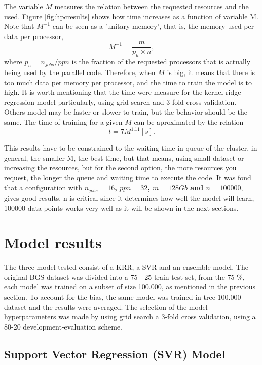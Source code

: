 The variable $M$ measures the relation between the requested resources and the used. Figure \ref{fig:hpcresults} shows how time increases as a function of variable M. Note that $M^{-1}$ can be seen as a 'unitary memory', that is, the memory used per data per processor,
\begin{equation*}
M^{-1} = \frac{m}{p_u \times n},
\end{equation*}
where $p_u = n_{jobs}/ppn$ is the fraction of the requested processors that is actually being used by the parallel code. Therefore, when $M$ is big, it means that there is too much data per memory per processor, and the time to train the model is to high. It is worth mentioning that the time were measure for the kernel ridge regression model particularly, using grid search and 3-fold cross validation. Others model may be faster or slower to train, but the behavior should be the same. The time of training for a given $M$ can be aproximated by the relation
\begin{equation}
	t = 7M^{1.11} [s].
\end{equation}

This results have to be constrained to the waiting time in queue of the cluster, in general, the smaller M, the best time, but that means, using small dataset or increasing the resources, but for the second option, the more resources you request, the longer the queue and waiting time to execute the code. It was fond that a configuration with \textbf{$n_{jobs} = 16$, $ppn = 32$, $m = 128 Gb$ and $n = 100000$}, gives good results. n is critical since it determines how well the model will learn, 100000 data points works very well as it will be shown in the next sections.  

\section{Model results}

The three model tested consist of a KRR, a SVR and an ensemble model. The original BGS dataset was divided into a 75 - 25 train-test set, from the 75 \%, each model was trained on a subset of size 100.000, as mentioned in the previous section. To account for the bias, the same model was trained in tree 100.000 dataset and the results were averaged. The selection of the model hyperparameters was made by using grid search a 3-fold cross validation, using a 80-20 development-evaluation scheme. 

\subsection{Support Vector Regression (SVR) Model}

